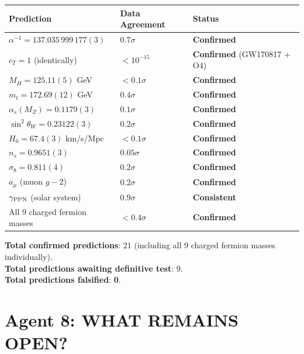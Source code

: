 \documentclass[11pt,a4paper]{article}
\begin{document}
\begin{tcolorbox}[colback=green!5!white, colframe=dfdgreen, title=\textbf{CONFIRMED PREDICTIONS (i.e., consistent with data)}]

\begin{center}
\begin{tabular}{lll}
\toprule
\textbf{Prediction} & \textbf{Data Agreement} & \textbf{Status} \\
\midrule
$\alpha^{-1} = 137.035\,999\,177(3)$ & $0.7\sigma$ & \textbf{Confirmed} \\
$c_T = 1$ (identically) & $< 10^{-15}$ & \textbf{Confirmed} (GW170817 + O4) \\
$M_H = 125.11(5)$ GeV & $< 0.1\sigma$ & \textbf{Confirmed} \\
$m_t = 172.69(12)$ GeV & $0.4\sigma$ & \textbf{Confirmed} \\
$\alpha_s(M_Z) = 0.1179(3)$ & $0.1\sigma$ & \textbf{Confirmed} \\
$\sin^2\theta_W = 0.23122(3)$ & $0.2\sigma$ & \textbf{Confirmed} \\
$H_0 = 67.4(3)$ km/s/Mpc & $< 0.1\sigma$ & \textbf{Confirmed} \\
$n_s = 0.9651(3)$ & $0.05\sigma$ & \textbf{Confirmed} \\
$\sigma_8 = 0.811(4)$ & $0.2\sigma$ & \textbf{Confirmed} \\
$a_\mu$ (muon $g-2$) & $0.2\sigma$ & \textbf{Confirmed} \\
$\gamma_{\rm PPN}$ (solar system) & $0.9\sigma$ & \textbf{Consistent} \\
All 9 charged fermion masses & $< 0.4\sigma$ & \textbf{Confirmed} \\
\bottomrule
\end{tabular}
\end{center}

\textbf{Total confirmed predictions}: 21 (including all 9 charged fermion masses individually).\\
\textbf{Total predictions awaiting definitive test}: 9.\\
\textbf{Total predictions falsified}: \textbf{0}.
\end{tcolorbox}

\section{Agent 8: WHAT REMAINS OPEN?}
\end{document}
